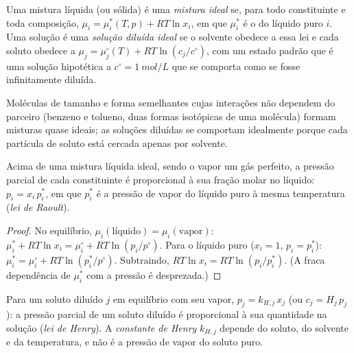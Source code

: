 \begin{definition}\label{def:b2:chemical-potential:ideal-mixture}
Uma mistura líquida (ou sólida) é uma \emph{mistura ideal}
se, para todo constituinte e toda composição,
$\mu_i = \mu_i^*(T, p) + RT\ln x_i$, em que $\mu_i^*$ é o 
do líquido puro $i$. Uma solução é uma \emph{solução diluída
ideal} se o solvente obedece a essa lei e cada
soluto obedece a $\mu_j = \mu_j^\circ(T) + RT\ln(c_j/c^\circ)$, com um estado
padrão que é uma solução hipotética a $c^\circ = \qty{1}{mol/L}$ que se
comporta como se fosse infinitamente diluída.
\end{definition}

Moléculas de tamanho e forma semelhantes cujas interações não dependem do
parceiro (benzeno e tolueno, duas formas isotópicas de uma molécula) formam
misturas quase ideais; as soluções diluídas se comportam idealmente porque
cada partícula de soluto está cercada apenas por solvente.

\begin{theorem}\label{thm:b2:chemical-potential:raoult}
Acima de uma mistura líquida ideal, sendo o vapor um gás perfeito, a pressão
parcial de cada constituinte é proporcional à sua fração molar no
líquido: $p_i = x_i\,p_i^*$, em que $p_i^*$ é a pressão de vapor do líquido
puro à mesma temperatura (\emph{lei de Raoult}).
\end{theorem}

\begin{proof}
No equilíbrio, $\mu_i(\text{líquido}) = \mu_i(\text{vapor})$: $\mu_i^* +
RT\ln x_i = \mu_i^\circ + RT\ln(p_i/p^\circ)$. Para o líquido puro ($x_i = 1$,
$p_i = p_i^*$): $\mu_i^* = \mu_i^\circ + RT\ln(p_i^*/p^\circ)$. Subtraindo,
$RT\ln x_i = RT\ln(p_i/p_i^*)$. (A fraca dependência de $\mu_i^*$ com a
pressão é desprezada.)
\end{proof}

\begin{proposition}\label{prop:b2:chemical-potential:henry}
Para um soluto diluído $j$ em equilíbrio com seu vapor, $p_j = k_{H,j}\,x_j$
(ou $c_j = H_j\,p_j$): a pressão parcial de um soluto diluído é
proporcional à sua quantidade na solução (\emph{lei de
Henry}). A \emph{constante de Henry}
$k_{H,j}$ depende do soluto, do solvente e da temperatura, e não é a
pressão de vapor do soluto puro.
\end{proposition}

